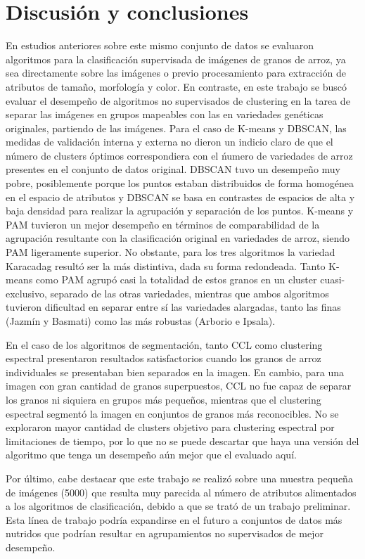 \documentclass{article}
\begin{document}
\section{Discusión y conclusiones}
En estudios anteriores sobre este mismo conjunto de datos se evaluaron algoritmos para la clasificación supervisada de imágenes de granos de arroz, ya sea directamente sobre las imágenes o previo procesamiento para extracción de atributos de tamaño, morfología y color. En contraste, en este trabajo se buscó evaluar el desempeño de algoritmos no supervisados de clustering en la tarea de separar las imágenes en grupos mapeables con las en variedades genéticas originales, partiendo de las imágenes. 
Para el caso de K-means y DBSCAN, las medidas de validación interna y externa no dieron un indicio claro de que el número de clusters óptimos correspondiera con el ńumero de variedades de arroz presentes en el conjunto de datos original. DBSCAN tuvo un desempeño muy pobre, posiblemente porque los puntos estaban distribuidos de forma homogénea en el espacio de atributos y DBSCAN se basa en contrastes de espacios de alta y baja densidad para realizar la agrupación y separación de los puntos. K-means y PAM tuvieron un mejor desempeño en términos de comparabilidad de la agrupación resultante con la clasificación original en variedades de arroz, siendo PAM ligeramente superior. No obstante, para los tres algoritmos la variedad Karacadag resultó ser la más distintiva, dada su forma redondeada. Tanto K-means como PAM agrupó casi la totalidad de estos granos en un cluster cuasi-exclusivo, separado de las otras variedades, mientras que ambos algoritmos tuvieron dificultad en separar entre sí las variedades alargadas, tanto las finas (Jazmín y Basmati) como las más robustas (Arborio e Ipsala).

En el caso de los algoritmos de segmentación, tanto CCL como clustering espectral presentaron resultados satisfactorios cuando los granos de arroz individuales se presentaban bien separados en la imagen. En cambio, para una imagen con gran cantidad de granos superpuestos, CCL no fue capaz de separar los granos ni siquiera en grupos más pequeños, mientras que el clustering espectral segmentó la imagen en conjuntos de granos más reconocibles. No se exploraron mayor cantidad de clusters objetivo para clustering espectral por limitaciones de tiempo, por lo que no se puede descartar que haya una versión del algoritmo que tenga un desempeño aún mejor que el evaluado aquí.

Por último, cabe destacar que este trabajo se realizó sobre una muestra pequeña de imágenes (5000) que resulta muy parecida al número de atributos alimentados a los algoritmos de clasificación, debido a que se trató de un trabajo preliminar. Esta línea de trabajo podría expandirse en el futuro a conjuntos de datos más nutridos que podrían resultar en agrupamientos no supervisados de mejor desempeño.


\printbibliography[title= Referencias, heading=bibintoc]
\end{document}
